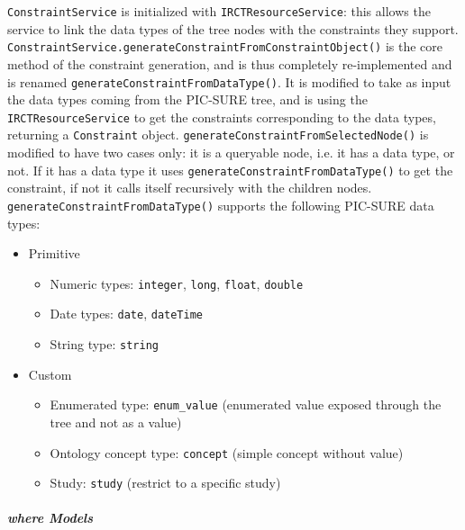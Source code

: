 \verb|ConstraintService| is initialized with \verb|IRCTResourceService|: this allows the service to link the data types of the tree nodes with the constraints they support. \\
\verb|ConstraintService.generateConstraintFromConstraintObject()| is the core method of the constraint generation, and is thus completely re-implemented and is renamed \verb|generateConstraintFromDataType()|.
It is modified to take as input the data types coming from the PIC-SURE tree, and is using the \verb|IRCTResourceService| to get the constraints corresponding to the data types, returning a \verb|Constraint| object.
\verb|generateConstraintFromSelectedNode()| is modified to have two cases only: it is a queryable node, i.e. it has a data type, or not. If it has a data type it uses \verb|generateConstraintFromDataType()| to get the constraint, if not it calls itself recursively with the children nodes.
\verb|generateConstraintFromDataType()| supports the following PIC-SURE data types:
\begin{itemize}
\item Primitive
    \begin{itemize}
        \item Numeric types: \verb|integer|, \verb|long|, \verb|float|, \verb|double|
        \item Date types: \verb|date|, \verb|dateTime|
        \item String type: \verb|string|
    \end{itemize}

\item Custom
    \begin{itemize}
        \item Enumerated type: \verb|enum_value| (enumerated value exposed through the tree and not as a value)
        \item Ontology concept type: \verb|concept| (simple concept without value)
        \item Study: \verb|study| (restrict to a specific study)
    \end{itemize}
\end{itemize}

\subparagraph{\emph{where} Models}

